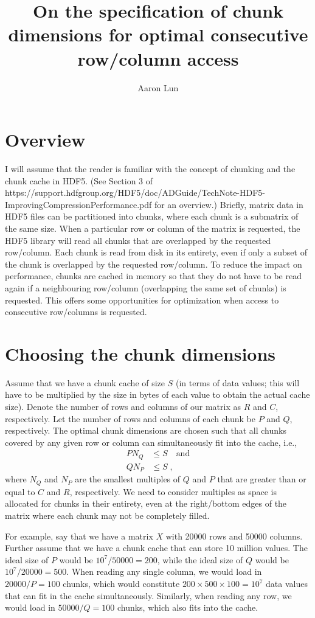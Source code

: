\documentclass{article}
\title{On the specification of chunk dimensions for optimal consecutive row/column access}
\author{Aaron Lun}
\begin{document}
\maketitle

\section*{Overview}
I will assume that the reader is familiar with the concept of chunking and the chunk cache in HDF5.
(See Section 3 of https://support.hdfgroup.org/HDF5/doc/ADGuide/TechNote-HDF5-ImprovingCompressionPerformance.pdf for an overview.)
Briefly, matrix data in HDF5 files can be partitioned into chunks, where each chunk is a submatrix of the same size.
When a particular row or column of the matrix is requested, the HDF5 library will read all chunks that are overlapped by the requested row/column.
Each chunk is read from disk in its entirety, even if only a subset of the chunk is overlapped by the requested row/column.
To reduce the impact on performance, chunks are cached in memory so that they do not have to be read again if a neighbouring row/column (overlapping the same set of chunks) is requested.
This offers some opportunities for optimization when access to consecutive row/columns is requested.

\section*{Choosing the chunk dimensions}
Assume that we have a chunk cache of size $S$ (in terms of data values; this will have to be multiplied by the size in bytes of each value to obtain the actual cache size).
Denote the number of rows and columns of our matrix as $R$ and $C$, respectively. 
Let the number of rows and columns of each chunk be $P$ and $Q$, respectively.
The optimal chunk dimensions are chosen such that all chunks covered by any given row or column can simultaneously fit into the cache, i.e., 
\begin{align*}
    P N_Q &\le S \quad\mbox{and}\\
    Q N_P &\le S \;,
\end{align*}
where $N_Q$ and $N_P$ are the smallest multiples of $Q$ and $P$ that are greater than or equal to $C$ and $R$, respectively.
We need to consider multiples as space is allocated for chunks in their entirety, even at the right/bottom edges of the matrix where each chunk may not be completely filled.

For example, say that we have a matrix $X$ with 20000 rows and 50000 columns.
Further assume that we have a chunk cache that can store 10 million values.
The ideal size of $P$ would be $10^7/50000 = 200$, while the ideal size of $Q$ would be $10^7/20000 = 500$.
When reading any single column, we would load in $20000/P = 100$ chunks, which would constitute $200 \times 500 \times 100 = 10^7$ data values that can fit in the cache simultaneously.
Similarly, when reading any row, we would load in $50000/Q = 100$ chunks, which also fits into the cache.
\end{document}
